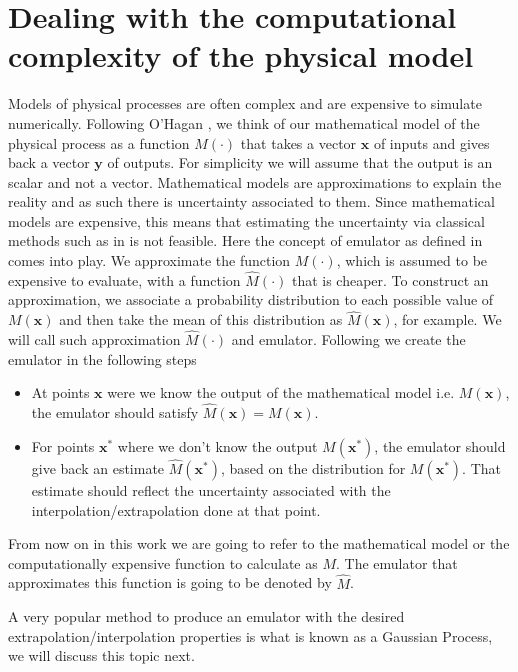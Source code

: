 \documentclass[12pt]{book}
\begin{document}
\section{Dealing with  the computational complexity of the physical model}
Models of physical processes are often complex and are  expensive to simulate numerically.
Following O'Hagan  \cite{o2006bayesian}, we think of our  mathematical model of the physical process
 as a function
$M(\cdot)$ that takes a vector $\textbf{x}$ of inputs and gives back a vector $\textbf{y}$ of outputs.
For simplicity we will assume that the output is an scalar and not a vector.  
Mathematical models are approximations to explain the reality and as such there is uncertainty associated
to them. Since mathematical models are expensive,
this means that estimating the uncertainty via   classical methods such  as in 
\cite{saltelli2000sensitivity} is not feasible. Here the concept of emulator as defined in \cite{o2006bayesian} 
comes into play. We 
approximate the function $M(\cdot)$, which is assumed to be expensive to evaluate,
 with a function $\hat{M}(\cdot)$ that is cheaper. To construct an approximation,   
we  associate a 
probability distribution to each  possible value of $M(\textbf{x})$ and then take the mean
of this distribution as  $\hat{M}(\textbf{x})$, for example. We will call such approximation $\hat{M}(\cdot)$ and emulator. 
Following \cite{o2006bayesian} we create the emulator in the following steps 
\begin{itemize}
\item At points $\textbf{x}$  were we know the output of the mathematical model i.e. $M(\textbf{x})$,
the emulator should satisfy $\hat{M}(\textbf{x})=M(\textbf{x})$.
\item For  points $\textbf{x}^{*}$ where we don't know the output $M(\textbf{x}^{*})$, the emulator should
give back an estimate $\hat{M}(\textbf{x}^{*})$, based on the distribution for $M(\textbf{x}^{*})$. 
That estimate should reflect the uncertainty associated with
the interpolation/extrapolation done at that point.
\end{itemize} 

From now on in this work we are going to refer to the mathematical model or the computationally expensive
function to calculate as $M$. The emulator that approximates this function is going to be denoted by $\hat{M}$.

A very popular  method to produce an emulator with the desired
extrapolation/interpolation properties is what is known as a Gaussian Process, we will discuss this topic next.  
\end{document}
